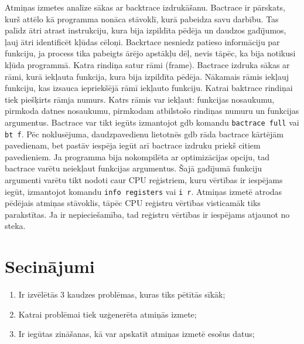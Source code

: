 Atmiņas izmetes analīze sākas ar backtrace izdrukāšanu. 
Bactrace ir pārskats, kurš attēlo kā programma nonāca stāvoklī, kurā pabeidza savu darbību.
Tas palīdz ātri atrast instrukciju, kura bija izpildīta pēdēja un daudzos gadījumos, ļauj ātri identificēt kļūdas cēloņi.
Backrtace nesniedz patieso informāciju par funkciju, ja process tika pabeigts ārējo apstākļu dēļ, nevis tāpēc, ka bija notikusi kļūda programmā.
Katra rindiņa satur rāmi (frame). Bactrace izdruka sākas ar rāmi, kurā iekļauta funkcija, kura bija izpildīta pēdēja. 
Nākamais rāmis iekļauj funkciju, kas izsauca iepriekšējā rāmī iekļauto funkciju.
Katrai baktrace rindiņai tiek piešķirts rāmja numurs. Katrs rāmis var iekļaut: funkcijas nosaukumu, pirmkoda datnes nosaukumu, pirmkodam atbilstošo rindiņas numuru un funkcijas argumentus. 
Bactrace var tikt iegūts izmantojot gdb komandu \texttt{bactrace full} vai \texttt{bt f}. 
Pēc noklusējuma, daudzpavedienu lietotnēs gdb  rāda bactrace kārtējām pavedienam, bet pastāv iespēja iegūt arī bactrace izdruku priekš citiem pavedieniem.
Ja programma bija nokompilēta ar optimizācijas opciju, tad bactrace varētu neiekļaut funkcijas argumentus.
Šajā gadījumā funkciju argumenti varētu tikt nodoti caur CPU reģistriem, kuru vērtības ir iespējams iegūt, izmantojot komandu \texttt{info registers} vai \texttt{i r}.
Atmiņas izmetē atrodas pēdējais atmiņas stāvoklis, tāpēc CPU reģistru vērtības visticamāk tiks parakstītas.
 Ja ir nepieciešamība, tad reģistru vērtības ir iespējams atjaunot no steka.

\section{Secinājumi}
\begin{enumerate}
\item Ir izvēlētās 3 kaudzes problēmas, kuras tiks pētītās sīkāk;
\item Katrai problēmai tiek uzģenerēta atmiņās izmete;
\item Ir iegūtas zināšanas, kā var apskatīt atmiņas izmetē esošus datus;
\end{enumerate}